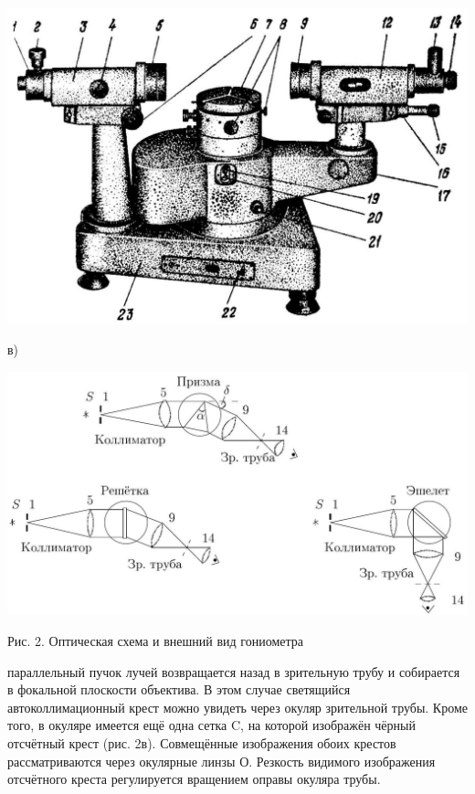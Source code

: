 \documentclass[a4paper,12pt]{article} %
\begin{document}
\begin{center}
\includegraphics[scale=0.2]{4.jpg}
\end{center}

в)

\begin{center}
\includegraphics[scale=0.2]{5.jpg}

Рис. 2. Оптическая схема и внешний вид гониометра

\end{center}

 параллельный пучок лучей возвращается назад в зрительную трубу и собирается в фокальной плоскости объектива. В этом случае светящийся автоколлимационный крест можно увидеть через окуляр зрительной трубы. Кроме того, в окуляре имеется ещё одна сетка C, на которой изображён чёрный отсчётный крест (рис. 2в). Совмещённые изображения обоих крестов рассматриваются через окулярные линзы О. Резкость видимого изображения отсчётного креста регулируется вращением оправы окуляра трубы.
\end{document}
